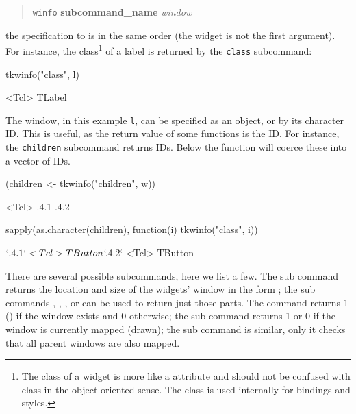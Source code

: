 \begin{quotation}
\texttt{winfo} \textbf{subcommand\_name} \textit{window}  
\end{quotation}
the specification to  is in the same order (the
widget is not the first argument). For instance, the
class\footnote{The class of a widget is more like a attribute and should
  not be confused with class in the object oriented sense. The class
  is used internally for bindings and styles.} of a label
is returned by the \texttt{class} subcommand:

\begin{Schunk}
\begin{Sinput}
 tkwinfo("class", l)
\end{Sinput}
\begin{Soutput}
<Tcl> TLabel 
\end{Soutput}
\end{Schunk}
%

The window, in this example \texttt{l}, can be specified as an \R\/
object, or by its character ID. This is useful, as the return value of
some functions is the ID. For instance, the \texttt{children}
subcommand returns IDs. Below the  function will
coerce these into a vector of IDs.


\begin{Schunk}
\begin{Sinput}
 (children <- tkwinfo("children", w))
\end{Sinput}
\begin{Soutput}
<Tcl> .4.1 .4.2 
\end{Soutput}
\begin{Sinput}
 sapply(as.character(children), function(i) tkwinfo("class", i))
\end{Sinput}
\begin{Soutput}
$`.4.1`
<Tcl> TButton 

$`.4.2`
<Tcl> TButton 
\end{Soutput}
\end{Schunk}

There are several possible subcommands, here we list a few. The
 sub command returns the location and
size of the widgets' window in the form ;
the sub commands ,
, , or
 can be used to return just those parts. The
 command returns 1 () if the
window exists and 0 otherwise; the  sub
command returns 1 or 0 if the window is currently mapped (drawn); the
 sub command is similar, only it checks
that all parent windows are also mapped.  

